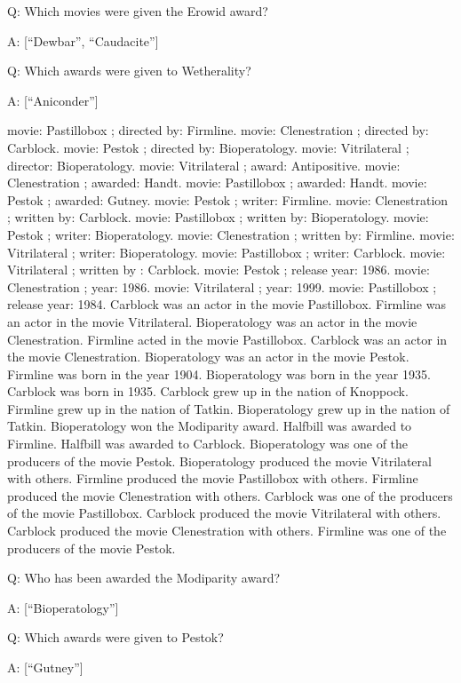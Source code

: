 \documentclass[
]{article}
\begin{document}
Q: Which movies were given the Erowid award?

A: {[}``Dewbar'', ``Caudacite''{]}

Q: Which awards were given to Wetherality?

A: {[}``Aniconder''{]}

movie: Pastillobox ; directed by: Firmline. movie: Clenestration ;
directed by: Carblock. movie: Pestok ; directed by: Bioperatology.
movie: Vitrilateral ; director: Bioperatology. movie: Vitrilateral ;
award: Antipositive. movie: Clenestration ; awarded: Handt. movie:
Pastillobox ; awarded: Handt. movie: Pestok ; awarded: Gutney. movie:
Pestok ; writer: Firmline. movie: Clenestration ; written by: Carblock.
movie: Pastillobox ; written by: Bioperatology. movie: Pestok ; writer:
Bioperatology. movie: Clenestration ; written by: Firmline. movie:
Vitrilateral ; writer: Bioperatology. movie: Pastillobox ; writer:
Carblock. movie: Vitrilateral ; written by : Carblock. movie: Pestok ;
release year: 1986. movie: Clenestration ; year: 1986. movie:
Vitrilateral ; year: 1999. movie: Pastillobox ; release year: 1984.
Carblock was an actor in the movie Pastillobox. Firmline was an actor in
the movie Vitrilateral. Bioperatology was an actor in the movie
Clenestration. Firmline acted in the movie Pastillobox. Carblock was an
actor in the movie Clenestration. Bioperatology was an actor in the
movie Pestok. Firmline was born in the year 1904. Bioperatology was born
in the year 1935. Carblock was born in 1935. Carblock grew up in the
nation of Knoppock. Firmline grew up in the nation of Tatkin.
Bioperatology grew up in the nation of Tatkin. Bioperatology won the
Modiparity award. Halfbill was awarded to Firmline. Halfbill was awarded
to Carblock. Bioperatology was one of the producers of the movie Pestok.
Bioperatology produced the movie Vitrilateral with others. Firmline
produced the movie Pastillobox with others. Firmline produced the movie
Clenestration with others. Carblock was one of the producers of the
movie Pastillobox. Carblock produced the movie Vitrilateral with others.
Carblock produced the movie Clenestration with others. Firmline was one
of the producers of the movie Pestok.

Q: Who has been awarded the Modiparity award?

A: {[}``Bioperatology''{]}

Q: Which awards were given to Pestok?

A: {[}``Gutney''{]}
\end{document}
